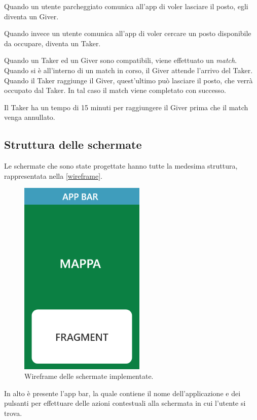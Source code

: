 Quando un utente parcheggiato comunica all'app di voler lasciare il posto, egli diventa un Giver.

Quando invece un utente comunica all'app di voler cercare un posto disponibile da occupare, diventa un Taker.

Quando un Taker ed un Giver sono compatibili, viene effettuato un \emph{match}. Quando si è all'interno di un match in corso, il Giver attende l'arrivo del Taker. Quando il
Taker raggiunge il Giver, quest'ultimo può lasciare il posto, che verrà occupato dal Taker. In tal caso il match viene completato con successo.

Il Taker ha un tempo di 15 minuti per raggiungere il Giver prima che il match venga annullato.

\hypertarget{struttura-delle-schermate}{%
\subsection{Struttura delle schermate}\label{struttura-delle-schermate}}

Le schermate che sono state progettate hanno tutte la medesima struttura, rappresentata nella \autoref{wireframe}.

\begin{figure}[H]
\centering
\includegraphics[width=6cm]{images/wireframe.png}
\caption{Wireframe delle schermate implementate.}
\label{wireframe}
\end{figure}

In alto è presente l'app bar, la quale contiene il nome dell'applicazione e dei pulsanti per effettuare delle azioni contestuali alla schermata in cui l'utente si trova.

